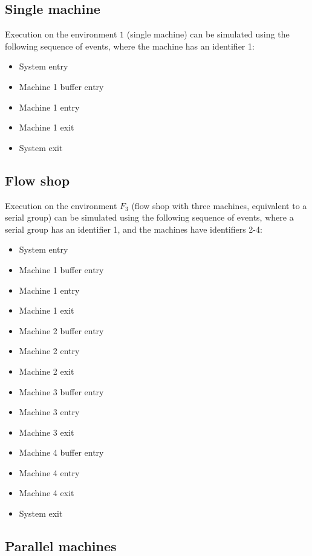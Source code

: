 \subsection{Single machine}

Execution on the environment $1$ (single machine) can be simulated using the following sequence of events, where the machine has an identifier 1:
\begin{itemize}
    \item System entry
    \item Machine 1 buffer entry
    \item Machine 1 entry
    \item Machine 1 exit
    \item System exit
  \end{itemize}

\subsection{Flow shop}

Execution on the environment $F_3$ (flow shop with three machines, equivalent to a serial group) can be simulated using the following sequence of events, where a serial group has an identifier 1, and the machines have identifiers 2-4:
\begin{itemize}
    \item System entry
    \item Machine 1 buffer entry
    \item Machine 1 entry
    \item Machine 1 exit
    \item Machine 2 buffer entry
    \item Machine 2 entry
    \item Machine 2 exit
    \item Machine 3 buffer entry
    \item Machine 3 entry
    \item Machine 3 exit
    \item Machine 4 buffer entry
    \item Machine 4 entry
    \item Machine 4 exit
    \item System exit
  \end{itemize}

\subsection{Parallel machines}

